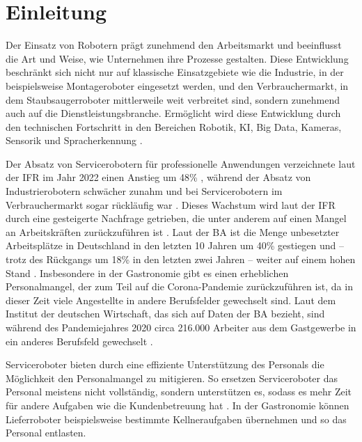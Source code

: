 \section{Einleitung}
Der Einsatz von Robotern prägt zunehmend den Arbeitsmarkt und beeinflusst die Art und Weise, wie Unternehmen ihre Prozesse gestalten. Diese Entwicklung beschränkt sich nicht nur auf klassische Einsatzgebiete wie die Industrie, in der beispielsweise Montageroboter eingesetzt werden, und den Verbrauchermarkt, in dem Staubsaugerroboter mittlerweile weit verbreitet sind, sondern zunehmend auch auf die Dienstleistungsbranche. Ermöglicht wird diese Entwicklung durch den technischen Fortschritt in den Bereichen Robotik, \ac{KI}, Big Data, Kameras, Sensorik und Spracherkennung \cite[S.~424]{Paluch2020}.

Der Absatz von Servicerobotern für professionelle Anwendungen verzeichnete laut der \ac{IFR} im Jahr 2022 einen Anstieg um 48\% \cite{IFR2023}, während der Absatz von Industrierobotern schwächer zunahm \cite[S.~9]{WorldRobotics2023} und bei Servicerobotern im Verbrauchermarkt sogar rückläufig war \cite[S.~37]{WorldRobotics2023}. Dieses Wachstum wird laut der \ac{IFR} durch eine gesteigerte Nachfrage getrieben, die unter anderem auf einen Mangel an Arbeitskräften zurückzuführen ist \cite[S.~33-34]{WorldRobotics2023}. Laut der \ac{BA} ist die Menge unbesetzter Arbeitsplätze in Deutschland in den letzten 10 Jahren um 40\% gestiegen und – trotz des Rückgangs um 18\% in den letzten zwei Jahren – weiter auf einem hohen Stand \cite{BA2024}. Insbesondere in der Gastronomie gibt es einen erheblichen Personalmangel, der zum Teil auf die Corona-Pandemie zurückzuführen ist, da in dieser Zeit viele Angestellte in andere Berufsfelder gewechselt sind. Laut dem Institut der deutschen Wirtschaft, das sich auf Daten der \ac{BA} bezieht, sind während des Pandemiejahres 2020 circa 216.000 Arbeiter aus dem Gastgewerbe in ein anderes Berufsfeld gewechselt \cite[S.~1]{Jansen2022}.

Serviceroboter bieten durch eine effiziente Unterstützung des Personals die Möglichkeit den Personalmangel zu mitigieren. So ersetzen Serviceroboter das Personal meistens nicht vollständig, sondern unterstützen es, sodass es mehr Zeit für andere Aufgaben wie die Kundenbetreuung hat \cite[S.~271-272]{Sprenger2015}. In der Gastronomie können Lieferroboter beispielsweise bestimmte Kellneraufgaben übernehmen und so das Personal entlasten.

